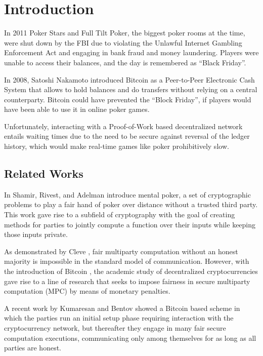 \section{Introduction}
In 2011 Poker Stars and Full Tilt Poker, the biggest poker rooms at the time, were shut down by the FBI due to violating the Unlawful Internet Gambling Enforcement Act \cite{treasury11} and engaging in bank fraud and money laundering. Players were unable to access their balances, and the day is remembered as “Black Friday”.

In 2008, Satoshi Nakamoto introduced Bitcoin  \cite{nakamoto08} as a Peer-to-Peer Electronic Cash System that allows to hold balances and do transfers without relying on a central counterparty. Bitcoin could have prevented the “Block Friday”, if players would have been able to use it in online poker games.

Unfortunately, interacting with a Proof-of-Work based decentralized network entails waiting times due to the need to be secure against reversal of the ledger history, which would make real-time games like poker prohibitively slow.


\subsection{Related Works}
In \cite{shamir81} Shamir, Rivest, and Adelman introduce mental poker, a set of cryptographic problems to play a fair hand of poker over distance without a trusted third party\cite{wikiMental}. This work gave rise to a subfield of cryptography with the goal of creating methods for parties to jointly compute a function over their inputs while keeping those inputs private. \cite{wikiMPC}
 
As demonstrated by Cleve \cite{cleve86}, fair multiparty computation without an honest majority is impossible in the standard model of communication. However, with the introduction of Bitcoin \cite{nakamoto08}, the academic study of decentralized cryptocurrencies gave rise to a line of research that seeks to impose fairness in secure multiparty computation (MPC) by means of monetary penalties\cite{bentov14}.
 
A recent work by Kumaresan and Bentov \cite{bentov14} showed a Bitcoin based scheme in which the parties run an initial setup phase requiring interaction with the cryptocurrency network, but thereafter they engage in many fair secure computation executions, communicating only among themselves for as long as all parties are honest.
 
